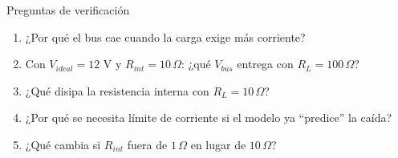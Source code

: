 \documentclass[aspectratio=169]{beamer}
\begin{document}
\begin{frame}{Preguntas de verificación}
  \begin{enumerate}
    \item ¿Por qué el bus cae cuando la carga exige más corriente?
    \item Con $V_{ideal} = 12$ V y $R_{int} = 10\,\Omega$: ¿qué $V_{bus}$ entrega con $R_L = 100\,\Omega$?
    \item ¿Qué disipa la resistencia interna con $R_L = 10\,\Omega$?
    \item ¿Por qué se necesita límite de corriente si el modelo ya ``predice'' la caída?
    \item ¿Qué cambia si $R_{int}$ fuera de $1\,\Omega$ en lugar de $10\,\Omega$?
  \end{enumerate}
\end{frame}
\end{document}
